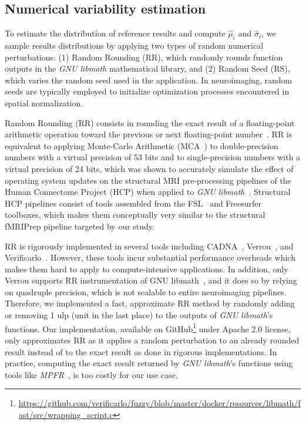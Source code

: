 \documentclass[lettersize,journal]{IEEEtran}
\begin{document}
{\subsection{Numerical variability estimation}  %
\label{subsec:numerical_variablity_model}

To estimate the distribution of reference results and compute $\hat \mu_i$ and $\hat \sigma_i$, we sample results distributions by applying two types of random numerical perturbations: (1) Random Rounding (RR), which randomly rounds function outputs in the \emph{GNU libmath} mathematical library, and (2) Random Seed (RS), which varies the random seed used in the application. In neuroimaging, random seeds are typically employed to initialize optimization processes encountered in spatial normalization.

Random Rounding (RR) consists in rounding the exact result of a floating-point arithmetic operation toward the previous or next floating-point number~\cite{forsythe1959reprint}. RR is equivalent to applying Monte-Carlo Arithmetic (MCA~\cite{parker1997monte}) to double-precision numbers with a virtual precision of 53 bits and to single-precision numbers with a virtual precision of 24 bits, which was shown to accurately simulate the effect of operating system updates on the structural MRI pre-processing pipelines of the Human Connectome Project (HCP) when applied to \emph{GNU libmath}~\cite{salari2021accurate}. Structural HCP pipelines consist of tools assembled from the FSL~\cite{jenkinson2012fsl} and Freesurfer~\cite{fischl2012freesurfer} toolboxes, which makes them conceptually very similar to the structural fMRIPrep pipeline targeted by our study.

RR is rigorously implemented in several tools including CADNA~\cite{jezequel2008cadna}, Verrou~\cite{fevotte2016verrou}, and Verificarlo~\cite{denis2016verificarlo}.
However, these tools incur substantial performance overheads which makes them hard to apply to compute-intensive applications. In addition, only Verrou supports RR instrumentation of GNU libmath~\cite{fevotte2019debugging}, and it does so by relying on quadruple precision, which is not scalable to entire neuroimaging pipelines.
Therefore, we implemented a fast, approximate RR method by randomly adding or removing 1 ulp (unit in the last place) to the outputs of \emph{GNU libmath}'s functions.
Our implementation, available on GitHub\footnote{\url{https://github.com/verificarlo/fuzzy/blob/master/docker/resources/libmath/fast/src/wrapping\_script.c}} under Apache 2.0 license,  only approximates RR as it applies a random perturbation to an already rounded result instead of to the exact result as done in rigorous implementations.
In practice, computing the exact result returned by \emph{GNU libmath}'s functions using tools like \emph{MPFR}~\cite{fousse2007mpfr}, is too costly for our use case.

}
\end{document}
